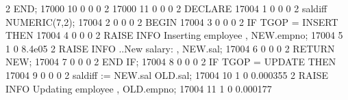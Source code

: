 \documentclass[letterpaper,10pt,english,openany,oneside]{sphinxmanual}
\begin{document}
\begin{sphinxVerbatim}[commandchars=\\\{\}]
    2 \textbar{} END;                                                             \textbar{}    17000 \textbar{}          10 \textbar{}          0 \textbar{}               0 \textbar{}          0
    2 \textbar{}                                                                  \textbar{}    17000 \textbar{}          11 \textbar{}          0 \textbar{}               0 \textbar{}          0
    2 \textbar{} DECLARE                                                          \textbar{}    17004 \textbar{}           1 \textbar{}          0 \textbar{}               0 \textbar{}          0
    2 \textbar{}     sal\PYGZus{}diff       NUMERIC(7,2);                                 \textbar{}    17004 \textbar{}           2 \textbar{}          0 \textbar{}               0 \textbar{}          0
    2 \textbar{} BEGIN                                                            \textbar{}    17004 \textbar{}           3 \textbar{}          0 \textbar{}               0 \textbar{}          0
    2 \textbar{}     IF TG\PYGZus{}OP = \PYGZsq{}INSERT\PYGZsq{} THEN                                     \textbar{}    17004 \textbar{}           4 \textbar{}          0 \textbar{}               0 \textbar{}          0
    2 \textbar{}         RAISE INFO \PYGZsq{}Inserting employee \PYGZpc{}\PYGZsq{}, NEW.empno;            \textbar{}    17004 \textbar{}           5 \textbar{}          1 \textbar{}               0 \textbar{}    8.4e\PYGZhy{}05
    2 \textbar{}         RAISE INFO \PYGZsq{}..New salary: \PYGZpc{}\PYGZsq{}, NEW.sal;                   \textbar{}    17004 \textbar{}           6 \textbar{}          0 \textbar{}               0 \textbar{}          0
    2 \textbar{}         RETURN NEW;                                              \textbar{}    17004 \textbar{}           7 \textbar{}          0 \textbar{}               0 \textbar{}          0
    2 \textbar{}     END IF;                                                      \textbar{}    17004 \textbar{}           8 \textbar{}          0 \textbar{}               0 \textbar{}          0
    2 \textbar{}     IF TG\PYGZus{}OP = \PYGZsq{}UPDATE\PYGZsq{} THEN                                     \textbar{}    17004 \textbar{}           9 \textbar{}          0 \textbar{}               0 \textbar{}          0
    2 \textbar{}         sal\PYGZus{}diff := NEW.sal \PYGZhy{} OLD.sal;                           \textbar{}    17004 \textbar{}          10 \textbar{}          1 \textbar{}               0 \textbar{}   0.000355
    2 \textbar{}         RAISE INFO \PYGZsq{}Updating employee \PYGZpc{}\PYGZsq{}, OLD.empno;             \textbar{}    17004 \textbar{}          11 \textbar{}          1 \textbar{}               0 \textbar{}   0.000177

\end{sphinxVerbatim}
\end{document}
